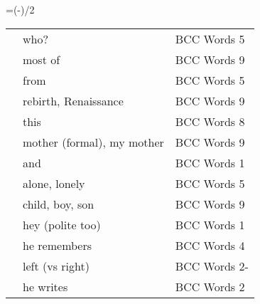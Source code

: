 \documentclass[10pt]{article}
\makeatletter
\newenvironment{indextable}{
\newbox\myb
\setbox\myb\vbox\bgroup\hsize=\dimexpr(\textwidth-\columnsep)/2\relax
\makeatletter
\chardef\LT@end@pen\z@
\makeatother
\begin{longtable}{p{0.1\textwidth}p{0.2\textwidth}>{\scriptsize}p{0.2\textwidth}}
}{
\end{longtable}\egroup
\setlength{\columnseprule}{0.4pt}
\begin{multicols*}{2}
\unvbox\myb
\end{multicols*}
}
\makeatother
\begin{document}
\begin{indextable}
\ta{مَن؟} & who? & BCC Words 5 \\
\ta{مُعْظَم،مُعْظَم ال} & most of & BCC Words 9 \\
\ta{مِن،مِن ال} & from & BCC Words 5 \\
\ta{نَهْضَة} & rebirth, Renaissance & BCC Words 9 \\
\ta{هذا،هذِهِ} & this & BCC Words 8 \\
\ta{والِدة،والِدَتي} & mother (formal), my mother & BCC Words 9 \\
\ta{وَ} & and & BCC Words 1 \\
\ta{وَحيد،وَحيدة} & alone, lonely & BCC Words 5 \\
\ta{وَلَد،أَوْلاد} & child, boy, son & BCC Words 9 \\
\ta{يا} & hey (polite too) & BCC Words 1 \\
\ta{يَتَذَكَّر} & he remembers & BCC Words 4 \\
\ta{يَسار} & left (vs right) & BCC Words 2- \\
\ta{يَكْتُب} & he writes & BCC Words 2 \\
\end{indextable}
\end{document}
